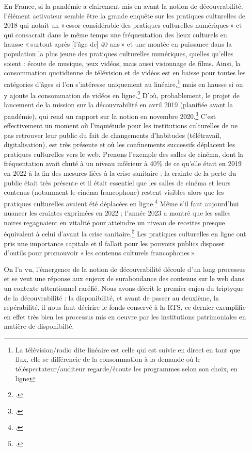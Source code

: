 En France, si la pandémie a clairement mis en avant la notion de découvrabilité, l’élément activateur semble être la grande enquête sur les pratiques culturelles de 2018 qui notait un « essor considérable des pratiques culturelles numériques » et qui consacrait dans le même temps une fréquentation des lieux culturels en hausse « surtout après [l’âge de] 40 ans » et une montée en puissance dans la population la plus jeune des pratiques culturelles numériques, quelles qu’elles soient : écoute de musique, jeux vidéos, mais aussi visionnage de films. Ainsi, la consommation quotidienne de télévision et de vidéos est en baisse pour toutes les catégories d’âges si l’on s’intéresse uniquement au linéaire,\footnote{La télévision/radio dite linéaire est celle qui est suivie en direct en tant que flux, elle se différencie de la consommation à la demande où le téléspectateur/auditeur regarde/écoute les programmes selon son choix, en ligne} mais en hausse si on y ajoute la consommation de vidéos en ligne.\footcite[p. 24]{2020b} D’où, probablement, le projet de lancement de la mission sur la découvrabilité en avril 2019 (planifiée avant la pandémie), qui rend un rapport sur la notion en novembre 2020.\footcite{zotero-263} C’est effectivement un moment où l’inquiétude pour les institutions culturelles de ne pas retrouver leur public du fait de changements d’habitudes (télétravail, digitalisation), est très présente et où les confinements successifs déplacent les pratiques culturelles vers le web. Prenons l’exemple des salles de cinéma, dont la fréquentation avait chuté à un niveau inférieur à 40\% de ce qu’elle était en 2019 en 2022 à la fin des mesures liées à la crise sanitaire ; la crainte de la perte du public était très présente et il était essentiel que les salles de cinéma et leurs contenus (notamment le cinéma francophone) restent visibles alors que les pratiques culturelles avaient été déplacées en ligne.\footcite[§1 et §2]{muller2022} Même s’il faut aujourd’hui nuancer les craintes exprimées en 2022 ; l’année 2023 a montré que les salles noires regagnaient en vitalité pour atteindre un niveau de recettes presque équivalent à celui d’avant la crise sanitaire.\footcite{2024m} Les pratiques culturelles en ligne ont pris une importance capitale et il fallait pour les pouvoirs publics disposer d’outils pour promouvoir « les contenus culturels francophones ».

On l’a vu, l’émergence de la notion de découvrabilité découle d’un long processus et se veut une réponse aux enjeux de surabondance des contenus sur le web dans un contexte attentionnel raréfié. Nous avons décrit le premier enjeu du triptyque de la découvrabilité : la disponibilité, et avant de passer au deuxième, la repérabilité, il nous faut décirire le fonds conservé à la RTS, ce dernier exemplifie en effet très bien les processus mis en oeuvre par les institutions patrimoniales en matière de disponibilté. 

